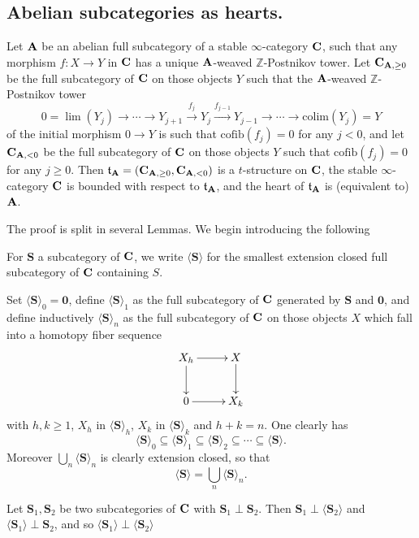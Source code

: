 \subsection{Abelian subcategories as hearts.}
\begin{proposition}\label{to.be.repeated.verbatim}
Let $\textbf{A}$ be an abelian full subcategory of a stable $\infty$-category $\textbf{C}$, such that any morphism $f\colon X\to Y$  in $\textbf{C}$ has a unique $\textbf{A}$-weaved $\mathbb{Z}$-Postnikov tower. Let
$\textbf{C}_{\textbf{A},\geq 0}$ be the full subcategory of $\textbf{C}$ on those objects $Y$ such that  the $\textbf{A}$-weaved $\mathbb{Z}$-Postnikov tower
\[
0 =\lim(Y_j)\to\cdots \to Y_{j+1} \xrightarrow{f_{j}} Y_{j} \xrightarrow{f_{j-1}}Y_{j-1}\to \cdots\to \mathrm{colim}(Y_j)=Y
\]
of the initial morphism $0\to Y$ is such that $\mathrm{cofib}(f_j)=0$ for any $j< 0$, and let $\textbf{C}_{\textbf{A},< 0}$ be the full subcategory of $\textbf{C}$ on those objects $Y$ such that $\mathrm{cofib}(f_j)=0$ for any $j\geq 0$. Then $\mathfrak{t}_{\textbf{A}}=(\textbf{C}_{\textbf{A},\geq 0}, \textbf{C}_{\textbf{A},<0})$ is a $t$-structure on $\textbf{C}$, the stable $\infty$-category $\textbf{C}$ is bounded with respect to $\mathfrak{t}_{\textbf{A}}$, and the heart of $\mathfrak{t}_{\textbf{A}}$ is (equivalent to) $\textbf{A}$.
\end{proposition}
 The proof is split in several Lemmas. We begin introducing the following
\begin{notat}
For $\mathbf{S}$ a subcategory of $\textbf{C}$, we write $\langle \mathbf{S}\rangle$ for the smallest extension closed full subcategory of $\textbf{C}$ containing $S$.
\end{notat}
\begin{remark}\label{extensions}
Set  $\langle \mathbf{S}\rangle_0=\mathbf{0}$,  define $\langle \mathbf{S}\rangle_1$ as the full subcategory of $\textbf{C}$ generated by $\mathbf{S}$ and $\mathbf{0}$, and define inductively $\langle \mathbf{S}\rangle_n$ as the full subcategory of $\textbf{C}$ on those objects $X$ which fall into a homotopy fiber sequence
\[
\xymatrix{
X_h\ar[r]\ar[d]& X\ar[d]\\
0\ar[r] &X_k
}
\]
with $h,k\geq 1$, $X_h$ in $\langle \mathbf{S}\rangle_h$, $X_k$ in $\langle \mathbf{S}\rangle_k$ and $h+k=n$. One clearly has 
\[
\langle \mathbf{S}\rangle_0\subseteq \langle \mathbf{S}\rangle_1 \subseteq \langle \mathbf{S}\rangle_2\subseteq\cdots \subseteq \langle \mathbf{S}\rangle.
\]
Moreover $\bigcup_n \langle \mathbf{S}\rangle_n$ is clearly extension closed, so that
\[
\langle \mathbf{S}\rangle =\bigcup_n \langle \mathbf{S}\rangle_n.
\] 
\end{remark}
\begin{lemma}\label{closure}
Let $\mathbf{S}_1,\mathbf{S}_2$ be two subcategories of $\textbf{C}$ with $\mathbf{S}_1\perp \mathbf{S}_2$. Then $\mathbf{S}_1\perp \langle\mathbf{S}_2\rangle$ and $\langle\mathbf{S}_1\rangle\perp \mathbf{S}_2$, and so $\langle\mathbf{S}_1\rangle\perp \langle\mathbf{S}_2\rangle$
\end{lemma}
